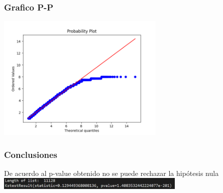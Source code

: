 \documentclass{beamer}
\begin{document}
\begin{frame}
  \frametitle{Grafico P-P}
  \includegraphics[width=8cm]{hip2/grafico_pp.png}
  
\end{frame}

\begin{frame}
  \frametitle{Conclusiones}
  De acuerdo al p-value obtenido no se puede rechazar la hipótesis nula
  \includegraphics[width=9cm]{hip2/p-val.jpg}
\end{frame}









\end{document}
